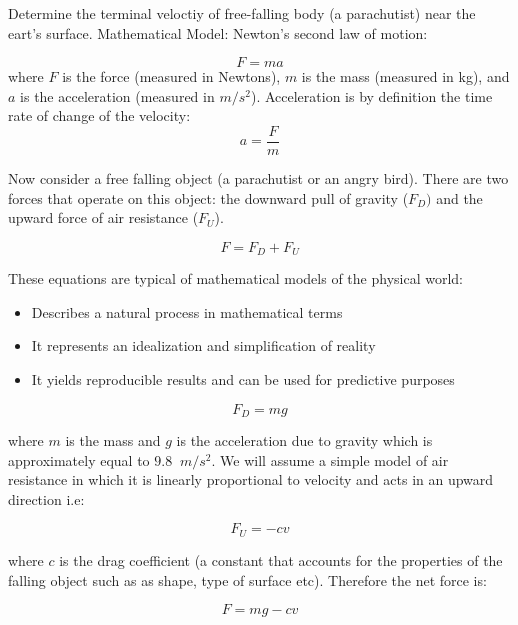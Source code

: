 \documentclass [titlepage,12pt,letter] {article}
\begin{document}
Determine the terminal veloctiy of free-falling body (a parachutist)
near the eart's surface. Mathematical Model: Newton's second law of motion: 

\begin{equation} 
F = m a 
\end{equation}  
\noindent 
where $F$ is the force (measured in Newtons), $m$ is the mass
(measured in kg), and $a$ is the acceleration (measured in $m/s^2$). 
Acceleration is by definition the time rate of change of the
velocity: 
\begin{equation} 
a = \frac{F}{m} 
\end{equation} 

Now consider a free falling object (a parachutist or an angry
bird). There are two forces that operate on this object: the downward
pull of gravity ($F_{D})$ and the upward force of air resistance ($F_{U}$). 

\begin{equation} 
F = F_{D} + F_{U}
\end{equation} 


These equations are typical of mathematical models of the physical
world: 

\begin{itemize} 
\item{Describes a natural process in mathematical terms}
\item{It represents an idealization and simplification of reality} 
\item{It yields reproducible results and can be used for predictive
    purposes} 
\end{itemize} 


\begin{equation} 
F_{D} = m g 
\end{equation} 

\noindent 
where $m$ is the mass and $g$ is the acceleration due to gravity 
which is approximately equal to $9.8\;\;m/s^2$. We will assume a
simple model of air resistance in which it is linearly proportional to
velocity and acts in an upward direction i.e: 

\begin{equation} 
F_{U} = - c v
\end{equation} 

\noindent where $c$ is the drag coefficient (a constant that accounts
for the properties of the falling object such as as shape, type of
surface etc). 
Therefore the net force is: 

\begin{equation} 
F = m g - c v
\end{equation} 
\end{document}

